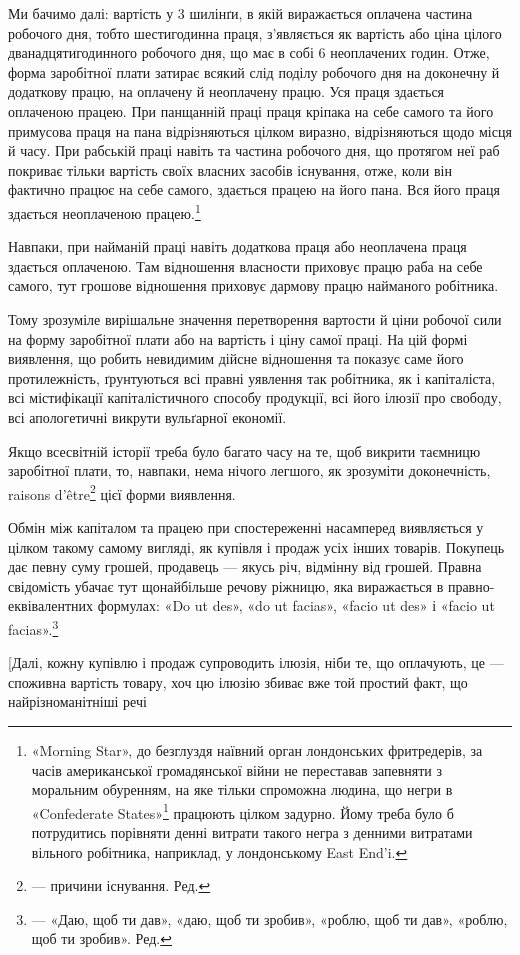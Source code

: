 Ми бачимо далі: вартість у 3 шилінґи, в якій виражається
оплачена частина робочого дня, тобто шестигодинна праця,
з’являється як вартість або ціна цілого дванадцятигодинного
робочого дня, що має в собі 6 неоплачених годин. Отже, форма
заробітної плати затирає всякий слід поділу робочого дня на
доконечну й додаткову працю, на оплачену й неоплачену працю.
Уся праця здається оплаченою працею. При панщанній праці
праця кріпака на себе самого та його примусова праця на пана
відрізняються цілком виразно, відрізняються щодо місця й часу.
При рабській праці навіть та частина робочого дня, що протягом
неї раб покриває тільки вартість своїх власних засобів існування,
отже, коли він фактично працює на себе самого, здається працею
на його пана. Вся його праця здається неоплаченою працею.\footnote{
«Morning Star», до безглуздя наївний орган лондонських фритредерів,
за часів американської громадянської війни не переставав запевняти
з моральним обуренням, на яке тільки спроможна людина, що
негри в «Confederate States»\footnote*{
— південних штатах. Ред.
} працюють цілком задурно. Йому треба
було б потрудитись порівняти денні витрати такого негра з денними витратами
вільного робітника, наприклад, у лондонському East End'i.
}

Навпаки, при найманій праці навіть додаткова праця або
неоплачена праця здається оплаченою. Там відношення власности
приховує працю раба на себе самого, тут грошове відношення
приховує дармову працю найманого робітника.

Тому зрозуміле вирішальне значення перетворення вартости
й ціни робочої сили на форму заробітної плати або на вартість
і ціну самої праці. На цій формі виявлення, що робить невидимим
дійсне відношення та показує саме його протилежність,
ґрунтуються всі правні уявлення так робітника, як і капіталіста,
всі містифікації капіталістичного способу продукції, всі
його ілюзії про свободу, всі апологетичні викрути вульґарної
економії.

Якщо всесвітній історії треба було багато часу на те, щоб
викрити таємницю заробітної плати, то, навпаки, нема нічого
легшого, як зрозуміти доконечність, raisons d’être\footnote*{
— причини існування. Ред.
} цієї форми
виявлення.

Обмін між капіталом та працею при спостереженні насамперед
виявляється у цілком такому самому вигляді, як купівля
і продаж усіх інших товарів. Покупець дає певну суму грошей,
продавець — якусь річ, відмінну від грошей. Правна свідомість
убачає тут щонайбільше речову ріжницю, яка виражається
в правно-еквівалентних формулах: «Do ut des», «do ut facias»,
«facio ut des» і «facio ut facias».\footnote*{
— «Даю, щоб ти дав», «даю, щоб ти зробив», «роблю, щоб ти дав»,
«роблю, щоб ти зробив». Ред.
}

[Далі, кожну купівлю і продаж супроводить ілюзія, ніби
те, що оплачують, це — споживна вартість товару, хоч цю ілюзію
збиває вже той простий факт, що найрізноманітніші речі